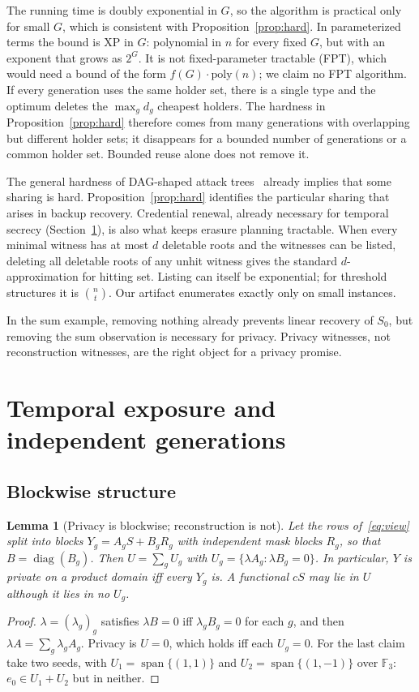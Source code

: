 \documentclass[pdflatex,sn-mathphys-num]{sn-jnl}%
\theoremstyle{plain}
\newtheorem{lemma}[theorem]{Lemma}
\theoremstyle{definition}
\newcommand{\F}{\mathbb{F}}
\begin{document}
The running time is doubly exponential in $G$, so the algorithm is practical only for small $G$, which is consistent with Proposition~\ref{prop:hard}. In parameterized terms the bound is XP in $G$: polynomial in $n$ for every fixed $G$, but with an exponent that grows as $2^G$. It is not fixed-parameter tractable (FPT), which would need a bound of the form $f(G)\cdot\mathrm{poly}(n)$; we claim no FPT algorithm. If every generation uses the same holder set, there is a single type and the optimum deletes the $\max_gd_g$ cheapest holders. The hardness in Proposition~\ref{prop:hard} therefore comes from many generations with overlapping but different holder sets; it disappears for a bounded number of generations or a common holder set. Bounded reuse alone does not remove it.

The general hardness of DAG-shaped attack trees~\cite{lopuhaa2022} already implies that some sharing is hard. Proposition~\ref{prop:hard} identifies the particular sharing that arises in backup recovery. Credential renewal, already necessary for temporal secrecy (Section~\ref{sec:temporal}), is also what keeps erasure planning tractable. When every minimal witness has at most $d$ deletable roots and the witnesses can be listed, deleting all deletable roots of any unhit witness gives the standard $d$-approximation for hitting set. Listing can itself be exponential; for threshold structures it is $\binom{n}{t}$. Our artifact enumerates exactly only on small instances.

In the sum example, removing nothing already prevents linear recovery of $S_0$, but removing the sum observation is necessary for privacy. Privacy witnesses, not reconstruction witnesses, are the right object for a privacy promise.


\section{Temporal exposure and independent generations}\label{sec:temporal}

\subsection{Blockwise structure}
\begin{lemma}[Privacy is blockwise; reconstruction is not]\label{lem:block}
Let the rows of~\eqref{eq:view} split into blocks $Y_g=A_gS+B_gR_g$ with independent mask blocks $R_g$, so that $B=\operatorname{diag}(B_g)$. Then $U=\sum_gU_g$ with $U_g=\{\lambda A_g:\lambda B_g=0\}$. In particular, $Y$ is private on a product domain iff every $Y_g$ is. A functional $cS$ may lie in $U$ although it lies in no $U_g$.
\end{lemma}
\begin{proof}
$\lambda=(\lambda_g)_g$ satisfies $\lambda B=0$ iff $\lambda_gB_g=0$ for each $g$, and then $\lambda A=\sum_g\lambda_gA_g$. Privacy is $U=0$, which holds iff each $U_g=0$. For the last claim take two seeds, with $U_1=\operatorname{span}\{(1,1)\}$ and $U_2=\operatorname{span}\{(1,-1)\}$ over $\F_3$: $e_0\in U_1+U_2$ but in neither.
\end{proof}
\end{document}
